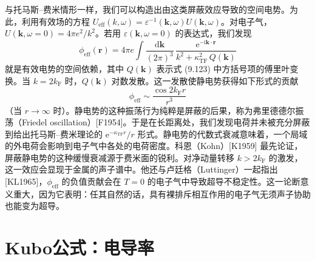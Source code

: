 与托马斯–费米情形一样，我们可以构造出由这类屏蔽效应导致的空间电势。为此，利用有效场的方程 $U_{\mathrm{eff}}(k,\omega)=\varepsilon^{-1}(\mathbf{k},\omega)U(\mathbf{k},\omega)$。对电子气，$U(\mathbf{k},\omega=0)=4\pi e^2/k^2$。若用 $\varepsilon(\mathbf{k},\omega=0)$ 的表达式，我们发现
\begin{equation*}
\phi_{\mathrm{eff}}(\mathbf{r})=4\pi e\int\frac{\mathrm{d}\mathbf{k}}{(2\pi)^3}\,\frac{\mathrm{e}^{-\mathrm{i}\mathbf{k}\cdot\mathbf{r}}}{k^2+\kappa_{\mathrm{TF}}^2\,Q(\mathbf{k})}\tag{9.124}
\end{equation*}
就是有效电势的空间依赖，其中 $Q(\mathbf{k})$ 表示式 (9.123) 中方括号项的傅里叶变换。当 $k=2k_{\mathrm{F}}$ 时，$Q(\mathbf{k})$ 对数发散。这一发散使静电势获得如下形式的贡献
\begin{equation*}
\phi_{\mathrm{eff}}\sim\frac{\cos 2k_{\mathrm{F}}r}{r^3}\tag{9.125}
\end{equation*}
（当 $r\to\infty$ 时）。静电势的这种振荡行为纯粹是屏蔽的后果，称为弗里德德尔振荡（Friedel oscillation）[F1954]。于是在长距离处，我们发现电荷并未被充分屏蔽到给出托马斯–费米理论的 $\mathrm{e}^{-\kappa_{\mathrm{TF}}r}/r$ 形式。静电势的代数式衰减意味着，一个局域的外电荷会影响到电子气中各处的电荷密度。科恩（Kohn）[K1959] 最先论证，屏蔽静电势的这种缓慢衰减源于费米面的锐利。对净动量转移 $k>2k_{\mathrm{F}}$ 的激发，这一效应会显现于金属的声子谱中。他还与卢廷格（Luttinger）一起指出 [KL1965]，$\phi_{\mathrm{eff}}$ 的负值贡献会在 $T=0$ 的电子气中导致超导不稳定性。这一论断意义重大，因为它表明：任其自然的话，具有裸排斥相互作用的电子气无须声子协助也能变为超导。

\section{Kubo公式：电导率}


